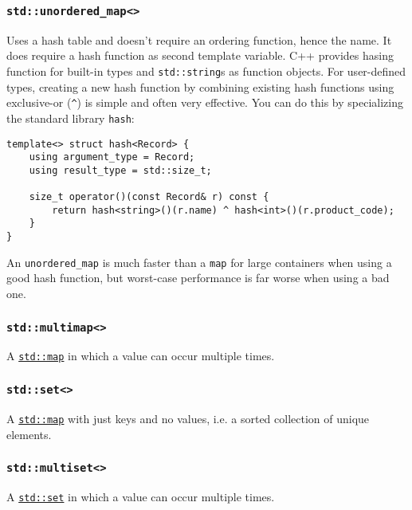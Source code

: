 \documentclass[8pt, table, xcdraw]{article}%
\begin{document}
\subsubsection{\lstinline{std::unordered_map<>}} \label{std_unordered_map}

Uses a hash table and doesn't require an ordering function, hence the name. It does require a hash function as second template variable. C++ provides hasing function for built-in types and \lstinline{std::string}s as function objects. For user-defined types, creating a new hash function by combining existing hash functions using exclusive-or (\lstinline{^}) is simple and often very effective. You can do this by specializing the standard library \lstinline{hash}:

\begin{lstlisting}
template<> struct hash<Record> {
    using argument_type = Record;
    using result_type = std::size_t;
    
    size_t operator()(const Record& r) const {
        return hash<string>()(r.name) ^ hash<int>()(r.product_code);
    }
}
\end{lstlisting}

An \lstinline{unordered_map} is much faster than a \lstinline{map} for large containers when using a good hash function, but worst-case performance is far worse when using a bad one.

\subsubsection{\lstinline{std::multimap<>}} \label{std_multimap}

A \hyperref[std_map]{\lstinline{std::map}} in which a value can occur multiple times.

\subsubsection{\lstinline{std::set<>}} \label{std_set}

A \hyperref[std_map]{\lstinline{std::map}} with just keys and no values, i.e. a sorted collection of unique elements.

\subsubsection{\lstinline{std::multiset<>}} \label{std_multiset}

A \hyperref[std_set]{\lstinline{std::set}} in which a value can occur multiple times.
\end{document}
